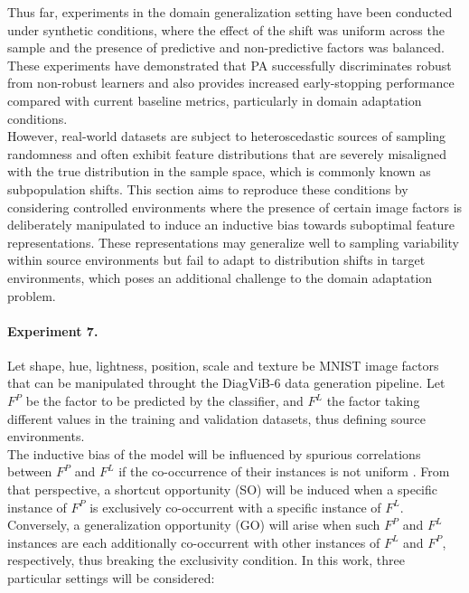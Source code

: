 Thus far, experiments in the domain generalization setting have been conducted 
under synthetic conditions, where the effect of the shift was uniform across the sample and the 
presence of predictive and non-predictive factors was balanced.  These experiments have 
demonstrated that PA successfully discriminates robust from non-robust learners and also provides 
increased early-stopping performance compared with current baseline metrics, particularly in
domain adaptation conditions. \\

However, real-world datasets are subject to heteroscedastic sources of sampling randomness 
and often exhibit feature distributions that are severely misaligned with the true distribution 
in the sample space, which is commonly known as subpopulation shifts. This section aims to reproduce these conditions 
by considering controlled environments where the presence of certain image factors is deliberately 
manipulated to induce an inductive bias towards suboptimal feature representations. These representations 
may generalize well to sampling variability within source environments but fail to adapt to 
distribution shifts in target environments, which poses an additional challenge to
the domain adaptation problem. 

\paragraph{Experiment 7.}\label{def:zso_theory}
    Let shape, hue, lightness, position, scale and texture be MNIST image factors that can be manipulated
    throught the DiagViB-6 data generation pipeline. Let $F^P$ be the factor to be predicted by the 
    classifier, and $F^L$ the factor taking different values in the training and validation datasets,
    thus defining source environments. \\
    
    The inductive bias of the model will be influenced by
    spurious correlations between $F^P$ and $F^L$ if the co-occurrence of their instances is
    not uniform \cite{euligDiagViB6DiagnosticBenchmark2021}. From that perspective, 
    a shortcut opportunity (SO) will be induced when a specific instance of $F^P$ is exclusively co-occurrent with a specific instance of $F^L$.
    Conversely, a generalization opportunity (GO) will arise when such $F^P$ and $F^L$ instances
    are each additionally co-occurrent with other instances of $F^L$ and $F^P$, respectively, thus breaking
    the exclusivity condition. In this work, three particular settings will be considered:

